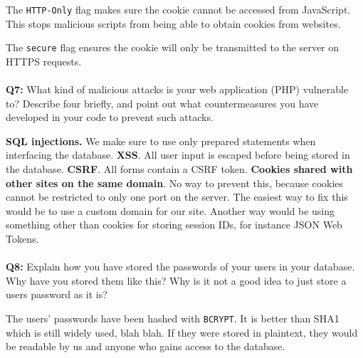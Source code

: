 The \verb/HTTP-Only/ flag makes sure the cookie cannot be accessed from JavaScript. This stops malicious scripts from being able to obtain cookies from websites.

The \verb/secure/ flag ensures the cookie will only be transmitted to the server on HTTPS requests.

\paragraph{}
\textbf{Q7:}
What kind of malicious attacks is your web application (PHP) vulnerable to? Describe four briefly, and point out what countermeasures you have developed in your code to prevent such attacks.

\textbf{SQL injections.} We make sure to use only prepared statements when interfacing the database.
\textbf{XSS}. All user input is escaped before being stored in the database.
\textbf{CSRF}. All forms contain a CSRF token.
\textbf{Cookies shared with other sites on the same domain}. No way to prevent this, because cookies cannot be restricted to only one port on the server.
The easiest way to fix this would be to use a custom domain for our site.
Another way would be using something other than cookies for storing session IDs, for instance JSON Web Tokens.

\paragraph{}
\textbf{Q8:}
Explain how you have stored the passwords of your users in your database. Why have you stored them like this? Why is it not a good idea to just store a users password as it is?

The users' passwords have been hashed with \verb/BCRYPT/.
It is better than SHA1 which is still widely used, blah blah.
If they were stored in plaintext, they would be readable by us and anyone who gains access to the database.

